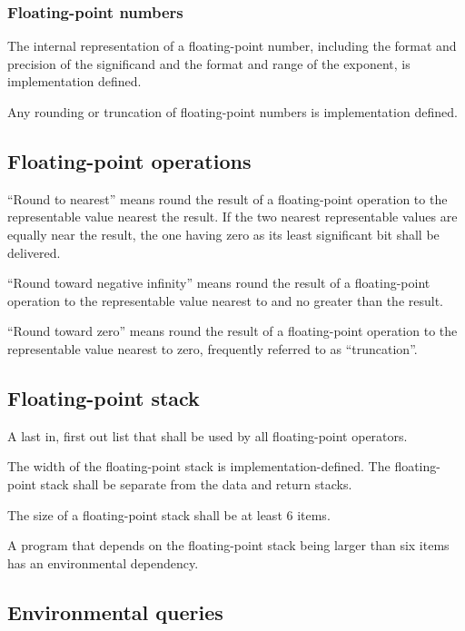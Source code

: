 \subsubsection{Floating-point numbers} %
\label{float:num}

The internal representation of a floating-point number, including the
format and precision of the significand and the format and range of
the exponent, is implementation defined.

Any rounding or truncation of floating-point numbers is implementation
defined.

\subsection{Floating-point operations} %
\label{float:ops}

``Round to nearest'' means round the result of a floating-point
operation to the representable value nearest the result. If the two
nearest representable values are equally near the result, the one
having zero as its least significant bit shall be delivered.

``Round toward negative infinity'' means round the result of a
floating-point operation to the representable value nearest to and
no greater than the result.

``Round toward zero'' means round the result of a floating-point
operation to the representable value nearest to zero, frequently
referred to as ``truncation''.

\subsection{Floating-point stack} %
\label{float:stack}

A last in, first out list that shall be used by all floating-point
operators.

The width of the floating-point stack is implementation-defined.
The floating-point stack shall be separate from the data and return
stacks.

The size of a floating-point stack shall be at least 6 items.

A program that depends on the floating-point stack being larger than
six items has an environmental dependency.

\subsection{Environmental queries} %

